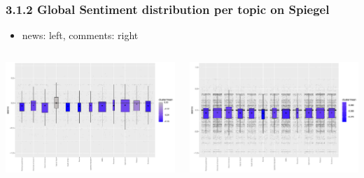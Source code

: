 \documentclass{tum-presentation}
\begin{document}
\begin{frame}
  \frametitle{3.1.2 Global Sentiment distribution per topic on Spiegel}
  \begin{itemize}
    \item news: left, comments: right
 \end{itemize}
  \begin{columns}
    \begin{minipage}[c]{\linewidth}
        \centering
        \includegraphics[width=0.95\linewidth]{figures/all_boxplot_all_sentiments_spiegel_news.pdf}
    \end{minipage}
    \begin{minipage}[c]{\linewidth}
        \centering
        \includegraphics[width=0.95\linewidth]{figures/all_boxplot_all_sentiments_spiegel_comments.pdf}
    \end{minipage}
\end{columns}
\end{frame}
\end{document}
